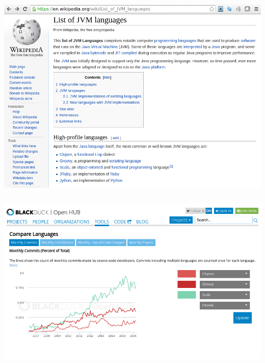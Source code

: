 \documentclass{beamer}
\begin{document}
\begin{frame}{}
\begin{columns}
\includegraphics[width=\linewidth]{jvm_languages.png}
\end{columns}
\end{frame}

\begin{frame}{}
\begin{columns}
\includegraphics[width=\linewidth]{popularity1.png}
\end{columns}
\end{frame}
\end{document}
